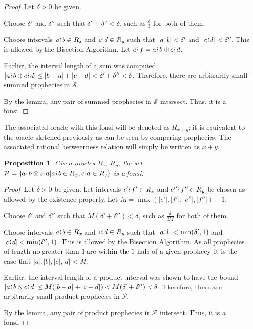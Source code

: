 \documentclass[12pt]{article}
\newtheorem{proposition}{Proposition}[section]
\begin{document}
\begin{proof}

    Let $\delta > 0$ be given. 

    Choose $\delta'$ and $\delta''$ such that $\delta' + \delta'' < \delta$, such as $\frac{\delta}{3}$ for both of them. 

    Choose intervals $a\rint b \in R_x$ and $c\rint d \in R_y$  such that  $|a\rint b| < \delta'$ and $|c\rint d| < \delta''$. This is allowed by the Bisection Algorithm. Let $e\rint f = a\rint b \oplus c\rint d$.
     
    Earlier, the interval length of a sum was computed:   $|a\rint b \oplus c\rint d| \leq |b-a| + |c-d| < \delta' + \delta'' < \delta$. Therefore, there are arbitrarily small summed prophecies in $\mathcal{S}$. 
    
    By the lemma, any pair of summed prophecies in $\mathcal{S}$ intersect. Thus, it is a fonsi. 
    
\end{proof}


The associated oracle with this fonsi will be denoted as $R_{x + y}$; it is equivalent to the oracle sketched previously as can be seen by comparing prophecies. The associated rational betweenness relation will simply be written as $x+y$. 

\begin{proposition}
    Given oracles $R_x$, $R_y$, the set $\mathcal{P} = \{a\rint b \otimes c\rint d| a\rint b \in R_x, c\rint d \in R_y\}$ is a fonsi. 
\end{proposition}

\begin{proof}

    Let $\delta > 0$ be given. Let intervals $e'\rint f' \in R_x$ and $e''\rint f'' \in R_y$ be chosen as allowed by the existence property. Let $M = \max(|e'|, |f'|, |e''|, |f''|) +1$. 

    Choose $\delta'$ and $\delta''$ such that $M(\delta' + \delta'') < \delta$, such as $\frac{\delta}{3M}$ for both of them. 

    Choose intervals $a\rint b \in R_x$ and $c\rint d \in R_y$  such that  $|a\rint b| < \min(\delta', 1)$ and $|c\rint d| < \min(\delta'', 1)$. This is allowed by the Bisection Algorithm. As all prophecies of length no greater than $1$ are within the $1$-halo of a given prophecy, it is the case that $|a|, |b|, |c|, |d| < M$. 
     
    Earlier, the interval length of a product interval was shown to have the bound   $|a\rint b \otimes c\rint d| \leq M (|b-a| + |c-d|) < M (\delta' + \delta'') < \delta$. Therefore, there are arbitrarily small product prophecies in $\mathcal{P}$. 
    
    By the lemma, any pair of product prophecies in $\mathcal{P}$ intersect. Thus, it is a fonsi. 
    
\end{proof}
\end{document}
